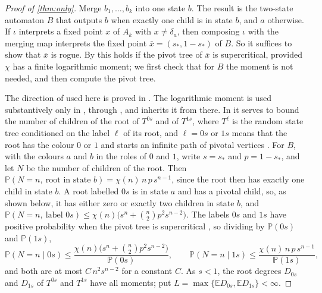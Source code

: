 \documentclass[11pt]{amsart}
\theoremstyle{remark}
\begin{document}
\begin{proof}[Proof of \cref{thm:only}]
Merge $b_1,\dots,b_k$ into one state $b$. The result is the two-state automaton $B$ that outputs $b$ when exactly one child is in state $b$, and $a$ otherwise. If $\iota$ interprets a fixed point $x$ of $A_k$ with $x\ne\delta_a$, then composing $\iota$ with the merging map interprets the fixed point $\bar x=(s_*,1-s_*)$ of $B$. So it suffices to show that $\bar x$ is rogue. By \cite[Theorem~1.7]{JPS} this holds if the pivot tree of $\bar x$ is supercritical, provided $\chi$ has a finite logarithmic moment; we first check that for $B$ the moment is not needed, and then compute the pivot tree.

The direction of \cite[Theorem~1.7]{JPS} used here is proved in \cite[Section~4]{JPS}. The logarithmic moment is used substantively only in \cite[Lemma~4.14]{JPS}, through \cite[Lemma~4.13]{JPS}, and \cite[Lemma~4.15]{JPS} inherits it from there. In \cite[Lemma~4.14]{JPS} it serves to bound the number of children of the root of $T^{0s}$ and of $T^{1s}$, where $T^{\ell}$ is the random state tree conditioned on the label $\ell$ of its root, and $\ell=0s$ or $1s$ means that the root has the colour $0$ or $1$ and starts an infinite path of pivotal vertices \cite[Section~4]{JPS}. For $B$, with the colours $a$ and $b$ in the roles of $0$ and $1$, write $s=s_*$ and $p=1-s_*$, and let $N$ be the number of children of the root. Then $\mathbb P(N=n,\ \text{root in state }b)=\chi(n)\,n\,p\,s^{n-1}$, since the root then has exactly one child in state $b$. A root labelled $0s$ is in state $a$ and has a pivotal child, so, as shown below, it has either zero or exactly two children in state $b$, and $\mathbb P(N=n,\ \text{label }0s)\le\chi(n)\bigl(s^n+\binom n2p^2s^{n-2}\bigr)$. The labels $0s$ and $1s$ have positive probability when the pivot tree is supercritical \cite[Proposition~2.6(c)]{JPS}, so dividing by $\mathbb P(0s)$ and $\mathbb P(1s)$,
\[
\mathbb P(N=n\mid 0s)\le\frac{\chi(n)\bigl(s^n+\binom n2p^2s^{n-2}\bigr)}{\mathbb P(0s)},\qquad
\mathbb P(N=n\mid 1s)\le\frac{\chi(n)\,n\,p\,s^{n-1}}{\mathbb P(1s)},
\]
and both are at most $C\,n^2s^{n-2}$ for a constant $C$. As $s<1$, the root degrees $D_{0s}$ and $D_{1s}$ of $T^{0s}$ and $T^{1s}$ have all moments; put $L=\max\{\mathbb E D_{0s},\mathbb E D_{1s}\}<\infty$.


\end{proof}
\end{document}
